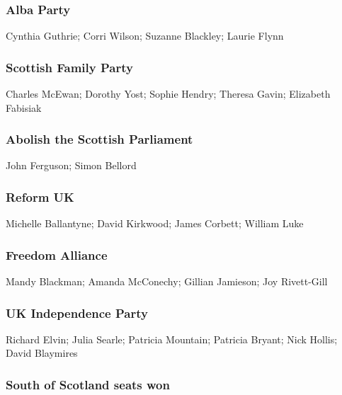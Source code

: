 \begin{resultsiii}
	\subsubsection*{Alba Party}
	Cynthia Guthrie; Corri Wilson; Suzanne Blackley; Laurie Flynn
	
	\subsubsection*{Scottish Family Party}
	Charles McEwan; Dorothy Yost; Sophie Hendry; Theresa Gavin; Elizabeth Fabisiak
	
	\subsubsection*{Abolish the Scottish Parliament}
	John Ferguson; Simon Bellord
	
	\subsubsection*{Reform UK}
	Michelle Ballantyne; David Kirkwood; James Corbett; William Luke
	
	\subsubsection*{Freedom Alliance}
	Mandy Blackman; Amanda McConechy; Gillian Jamieson; Joy Rivett-Gill
	
	\subsubsection*{UK Independence Party}
	Richard Elvin; Julia Searle; Patricia Mountain; Patricia Bryant; Nick Hollis; David Blaymires
\end{resultsiii}

\subsubsection*{South of Scotland seats won}

